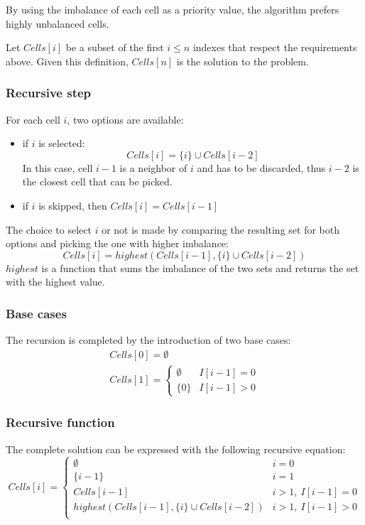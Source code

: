By using the imbalance of each cell as a priority value, the algorithm prefers highly unbalanced cells.

Let $Cells[i]$ be a subset of the first $i \le n$ indexes that respect the requirements above. Given this definition, $Cells[n]$ is the solution to the problem.

\subsubsection{Recursive step}
For each cell $i$, two options are available:
\begin{itemize}
    \item if $i$ is selected:
          \[
              Cells[i] = \{i\} \cup Cells[i-2]
          \]
          In this case, cell $i-1$ is a neighbor of $i$ and has to be discarded, thus $i-2$ is the closest cell that can be picked.
    \item if $i$ is skipped, then $Cells[i]=Cells[i-1]$
\end{itemize}
The choice to select $i$ or not is made by comparing the resulting set for both options and picking the one with higher imbalance:
\begin{equation}
    Cells[i] = \mathit{highest}(Cells[i-1], \{i\} \cup Cells[i-2])
\end{equation}
$\mathit{highest}$ is a function that sums the imbalance of the two sets and returns the set with the highest value.

\subsubsection{Base cases}
The recursion is completed by the introduction of two base cases:
\begin{gather}
    Cells[0]=\emptyset \\
    Cells[1]=\begin{cases}
        \emptyset & I[i-1] = 0 \\
        \{ 0 \}   & I[i-1] > 0
    \end{cases}
\end{gather}

\subsubsection{Recursive function}
The complete solution can be expressed with the following recursive equation:
\[
    Cells[i] = \begin{cases}
        \emptyset                                           & i=0                \\
        \{i-1\}                                             & i=1                \\
        Cells[i-1]                                          & i > 1,\ I[i-1] = 0 \\
        \mathit{highest}(Cells[i-1], \{i\} \cup Cells[i-2]) & i > 1,\ I[i-1] > 0 \\
    \end{cases}
\]

